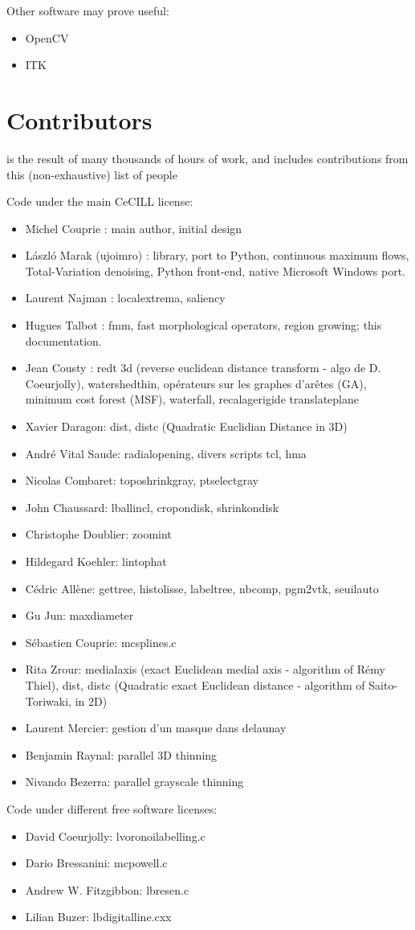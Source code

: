 Other software may prove useful: 

\begin{itemize}
\item OpenCV
\item ITK
\end{itemize}

\section*{Contributors}
\Pink is the result of many thousands of hours of work, and includes
contributions from this (non-exhaustive) list of people

Code under the main CeCILL license:
\begin{itemize}
\item Michel Couprie : main author, initial design
\item László Marak (ujoimro) : library, port to Python, continuous maximum flows, Total-Variation denoising, Python front-end, native Microsoft Windows port.
\item Laurent Najman : localextrema, saliency
\item Hugues Talbot : fmm, fast morphological operators, region growing; this documentation.
\item Jean Cousty : redt 3d (reverse euclidean distance transform - algo de D. Coeurjolly), watershedthin, opérateurs sur les graphes d'arêtes (GA), minimum cost forest (MSF), waterfall, recalagerigide translateplane
\item Xavier Daragon: dist, distc (Quadratic Euclidian Distance in 3D)
\item André Vital Saude: radialopening, divers scripts tcl, hma
\item Nicolas Combaret: toposhrinkgray, ptselectgray
\item John Chaussard: lballincl, cropondisk, shrinkondisk
\item Christophe Doublier: zoomint
\item Hildegard Koehler: lintophat
\item Cédric Allène: gettree, histolisse, labeltree, nbcomp, pgm2vtk, seuilauto
\item Gu Jun: maxdiameter
\item Sébastien Couprie: mcsplines.c
\item Rita Zrour: medialaxis (exact Euclidean medial axis - algorithm of Rémy Thiel), dist, distc (Quadratic exact Euclidean distance - algorithm of Saito-Toriwaki, in 2D)
\item Laurent Mercier: gestion d'un masque dans delaunay
\item Benjamin Raynal: parallel 3D thinning
\item Nivando Bezerra: parallel grayscale thinning
\end{itemize}

Code under different free software licenses:
\begin{itemize}
\item David Coeurjolly: lvoronoilabelling.c
\item Dario Bressanini: mcpowell.c
\item Andrew W. Fitzgibbon: lbresen.c
\item Lilian Buzer: lbdigitalline.cxx
\end{itemize}